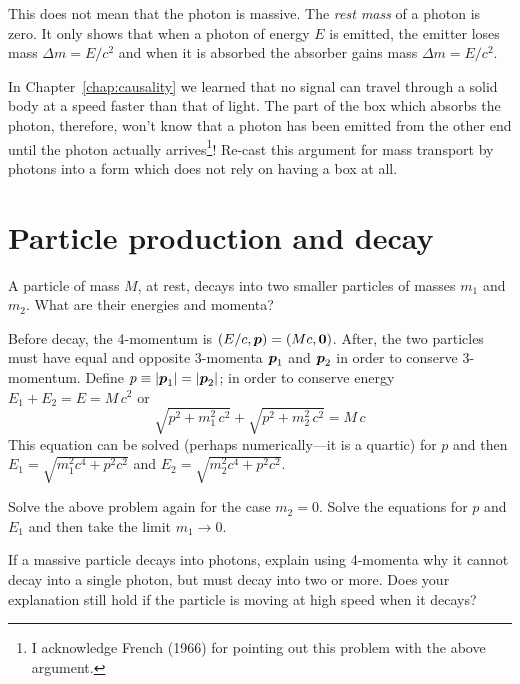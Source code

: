 This does not mean that the photon is massive.  The {\em rest mass\/}
of a photon is zero.  It only shows that when a photon of energy $E$
is emitted, the emitter loses mass $\Delta m=E/c^2$ and when it is
absorbed the absorber gains mass $\Delta m=E/c^2$.

\begin{problem}
In Chapter~\ref{chap:causality} we learned that no signal can travel
through a solid body at a speed faster than that of light.  The part
of the box which absorbs the photon, therefore, won't know that a
photon has been emitted from the other end until the photon actually
arrives\footnote{I acknowledge French (1966) for pointing out this
problem with the above argument.}!  Re-cast this argument for mass
transport by photons into a form which does not rely on having a box
at all.
\end{problem}


\section{Particle production and decay}
\label{sec:decay}

\begin{problem}
A particle of mass $M$, at rest, decays into two smaller
particles of masses $m_1$ and $m_2$.  What are their energies and
momenta?
\end{problem}

Before decay, the 4-momentum is $(E/c,\mbox{\boldmath $p$})=(Mc,\mbox{\boldmath $0$})$.  After,
the two particles must have equal and opposite 3-momenta $\mbox{\boldmath $p$}_1$
and $\mbox{\boldmath $p$}_2$ in order to conserve 3-momentum.  Define $p\equiv
|\mbox{\boldmath $p$}_1|=|\mbox{\boldmath $p$}_2|$; in order to conserve energy
$E_1+E_2=E=M\,c^2$ or
\begin{equation}
\sqrt{p^2+m_1^2\,c^2}+\sqrt{p^2+m_2^2\,c^2}=M\,c
\end{equation}
This equation can be solved (perhaps numerically---it is a quartic)
for $p$ and then $E_1=\sqrt{m_1^2c^4+p^2c^2}$ and
$E_2=\sqrt{m_2^2c^4+p^2c^2}$.

\begin{problem}
Solve the above problem again for the case $m_2=0$.  Solve the
equations for $p$ and $E_1$ and then take the limit $m_1\rightarrow
0$.
\end{problem}

\begin{problem}
If a massive particle decays into photons, explain using
4-momenta why it cannot decay into a single photon, but must decay
into two or more.  Does your explanation still hold if the particle is
moving at high speed when it decays?
\end{problem}

